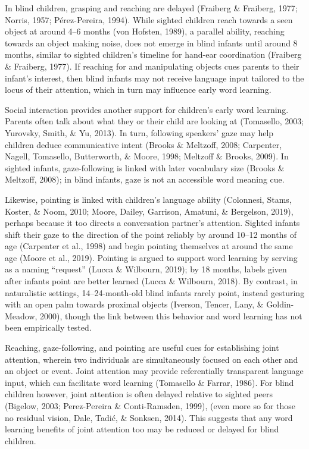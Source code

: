 \documentclass[english,man,floatsintext]{apa6}
\begin{document}
In blind children, grasping and reaching are delayed (Fraiberg \& Fraiberg, 1977; Norris, 1957; Pérez-Pereira, 1994). While sighted children reach towards a seen object at around 4--6 months (von Hofsten, 1989), a parallel ability, reaching towards an object making noise, does not emerge in blind infants until around 8 months, similar to sighted children's timeline for hand-ear coordination (Fraiberg \& Fraiberg, 1977). If reaching for and manipulating objects cues parents to their infant's interest, then blind infants may not receive language input tailored to the locus of their attention, which in turn may influence early word learning.

Social interaction provides another support for children's early word learning. Parents often talk about what they or their child are looking at (Tomasello, 2003; Yurovsky, Smith, \& Yu, 2013). In turn, following speakers' gaze may help children deduce communicative intent (Brooks \& Meltzoff, 2008; Carpenter, Nagell, Tomasello, Butterworth, \& Moore, 1998; Meltzoff \& Brooks, 2009). In sighted infants, gaze-following is linked with later vocabulary size (Brooks \& Meltzoff, 2008); in blind infants, gaze is not an accessible word meaning cue.

Likewise, pointing is linked with children's language ability (Colonnesi, Stams, Koster, \& Noom, 2010; Moore, Dailey, Garrison, Amatuni, \& Bergelson, 2019), perhaps because it too directs a conversation partner's attention. Sighted infants shift their gaze to the direction of the point reliably by around 10--12 months of age (Carpenter et al., 1998) and begin pointing themselves at around the same age (Moore et al., 2019). Pointing is argued to support word learning by serving as a naming \enquote{request} (Lucca \& Wilbourn, 2019); by 18 months, labels given after infants point are better learned (Lucca \& Wilbourn, 2018). By contrast, in naturalistic settings, 14--24-month-old blind infants rarely point, instead gesturing with an open palm towards proximal objects (Iverson, Tencer, Lany, \& Goldin-Meadow, 2000), though the link between this behavior and word learning has not been empirically tested.

Reaching, gaze-following, and pointing are useful cues for establishing joint attention, wherein two individuals are simultaneously focused on each other and an object or event. Joint attention may provide referentially transparent language input, which can facilitate word learning (Tomasello \& Farrar, 1986). For blind children however, joint attention is often delayed relative to sighted peers (Bigelow, 2003; Perez-Pereira \& Conti-Ramsden, 1999), (even more so for those no residual vision, Dale, Tadić, \& Sonksen, 2014). This suggests that any word learning benefits of joint attention too may be reduced or delayed for blind children.
\end{document}
